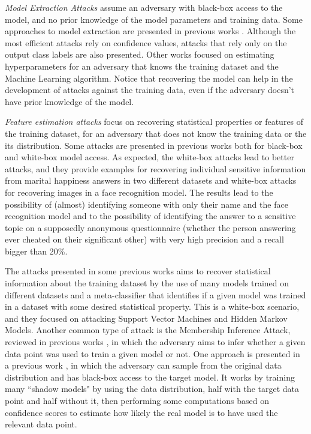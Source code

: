 \documentclass[conference]{IEEEtran}
\newcommand{\qm}[1]{``#1"}
\begin{document}
\emph{Model Extraction Attacks} assume an adversary with black-box access to the model, and no prior knowledge of the model parameters and training data. Some approaches to model extraction are presented in previous works \cite{tramer2016stealing}. Although the most efficient attacks rely on confidence values, attacks that rely only on the output class labels are also presented. Other works focused on estimating hyperparameters \cite{wang2018stealing} for an adversary that knows the training dataset and the Machine Learning algorithm. Notice that recovering the model can help in the development of attacks against the training data, even if the adversary doesn't have prior knowledge of the model.

\emph{Feature estimation attacks} focus on recovering statistical properties or features of the training dataset, for an adversary that does not know the training data or the its distribution. Some attacks are presented in previous works \cite{fredrikson2015model} both for black-box and white-box model access. As expected, the white-box attacks lead to better attacks, and they provide examples for recovering individual sensitive information from marital happiness answers in two different datasets and white-box attacks for recovering images in a face recognition model. The results lead to the possibility of (almost) identifying someone with only their name and the face recognition model and to the possibility of identifying the answer to a sensitive topic on a supposedly anonymous questionnaire (whether the person answering ever cheated on their significant other) with very high precision and a recall bigger than 20\%. 

The attacks presented in some previous works \cite{ateniese2015hacking} aims to recover statistical information about the training dataset by the use of many models trained on different datasets and a meta-classifier that identifies if a given model was trained in a dataset with some desired statistical property. This is a white-box scenario, and they focused on attacking Support Vector Machines and Hidden Markov Models. Another common type of attack is the Membership Inference Attack, reviewed in previous works \cite{hu2022membership}, in which the adversary aims to infer whether a given data point was used to train a given model or not. One approach is presented in a previous work \cite{carlini2022membership}, in which the adversary can sample from the original data distribution and has black-box access to the target model. It works by training many \qm{shadow models} by using the data distribution, half with the target data point and half without it, then performing some computations based on confidence scores to estimate how likely the real model is to have used the relevant data point.
\end{document}
